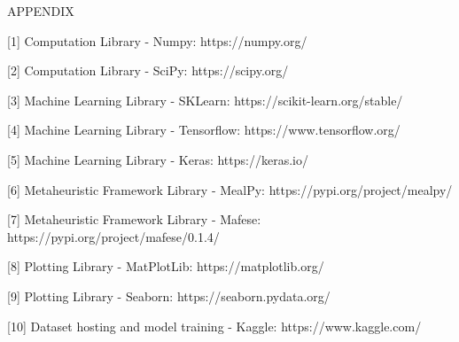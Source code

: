 \thispagestyle{plain}
\begin{center}
\large \large {APPENDIX}

\end{center}

[1] Computation Library - Numpy: https://numpy.org/

[2] Computation Library - SciPy: https://scipy.org/ 

[3] Machine Learning Library - SKLearn: https://scikit-learn.org/stable/ 

[4] Machine Learning Library - Tensorflow: https://www.tensorflow.org/

[5] Machine Learning Library - Keras: https://keras.io/

[6] Metaheuristic Framework Library - MealPy: https://pypi.org/project/mealpy/

[7] Metaheuristic Framework Library - Mafese: https://pypi.org/project/mafese/0.1.4/

[8] Plotting Library - MatPlotLib: https://matplotlib.org/

[9] Plotting Library - Seaborn: https://seaborn.pydata.org/

[10] Dataset hosting and model training - Kaggle: https://www.kaggle.com/
